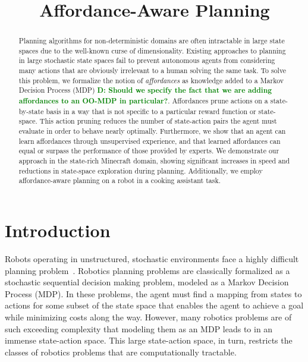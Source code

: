 \documentclass[conference]{IEEEtran}
\newcommand{\dnote}[1]{\textcolor{Green}{\textbf{D: #1}}}
\begin{document}
\title{Affordance-Aware Planning}

\author{
}

\maketitle

\begin{abstract}
Planning algorithms for non-deterministic domains are often
intractable in large state spaces due to the well-known curse of
dimensionality. Existing approaches to planning in large stochastic state spaces fail to
prevent autonomous agents from considering many actions that are
obviously irrelevant to a human solving the same task. To solve this problem,
we formalize the notion of {\em affordances} as knowledge added to a Markov Decision Process (MDP) \dnote{Should we specify the fact that
we are adding affordances to an OO-MDP in particular?}.
Affordances prune actions on a state-by-state basis in a way that is
not specific to a particular reward function or state-space. This action pruning
reduces the number of state-action pairs the agent must evaluate
in order to behave nearly optimally. Furthermore, we show that an
agent can learn affordances through unsupervised experience, and that learned
affordances can equal or surpass the performance of those
provided by experts. We demonstrate our approach in the state-rich
Minecraft domain, showing significant increases in speed and reductions in state-space exploration during
planning. Additionally, we employ affordance-aware planning on a robot in a cooking assistant task. 

\end{abstract}

\IEEEpeerreviewmaketitle

\section{Introduction}
\label{sec:introduction}

Robots operating in unstructured, stochastic environments face a highly difficult planning problem~\citep{bollini12, knepper13}.
Robotics planning problems are classically formalized as a stochastic sequential
decision making problem, modeled as a Markov Decision Process (MDP). In these problems,
the agent must find a mapping from states to actions for some subset of the state space that enables the
agent to achieve a goal while minimizing costs along the way. However, many robotics 
problems are of such exceeding complexity that modeling them as an MDP
leads to in an immense state-action space. This large state-action space, in turn, 
restricts the classes of robotics problems that are computationally tractable.
 
\end{document}
